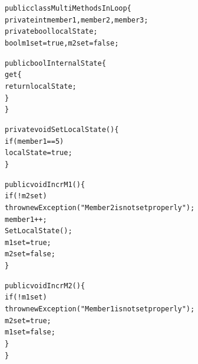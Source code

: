 \begin{figure}[t]
\begin{CodeOut}
\begin{alltt}
public class MultiMethodsInLoop \{
\hspace*{0.2in}private int member1, member2, member3;
\hspace*{0.2in}private bool localState;
\hspace*{0.2in}bool m1set = true, m2set = false;
        
\hspace*{0.2in}public bool InternalState \{
\hspace*{0.3in}get \{
\hspace*{0.4in}return localState;
\hspace*{0.3in}\}
\hspace*{0.2in}\}

\hspace*{0.2in}private void SetLocalState() \{
\hspace*{0.3in}if (member1 == 5)
\hspace*{0.4in}localState = true;
\hspace*{0.2in}\}

\hspace*{0.2in}public void IncrM1() \{
\hspace*{0.3in}if (!m2set)
\hspace*{0.4in}throw new Exception("Member2 is not set properly");
\hspace*{0.3in}member1++;
\hspace*{0.3in}SetLocalState();
\hspace*{0.3in}m1set = true;
\hspace*{0.3in}m2set = false;
\hspace*{0.2in}\}

\hspace*{0.2in}public void IncrM2() \{
\hspace*{0.3in}if (!m1set)
\hspace*{0.4in}throw new Exception("Member1 is not set properly");
\hspace*{0.3in}m2set = true;
\hspace*{0.3in}m1set = false;
\hspace*{0.2in}\}
\}
\end{alltt}
\end{CodeOut}
\end{figure}

